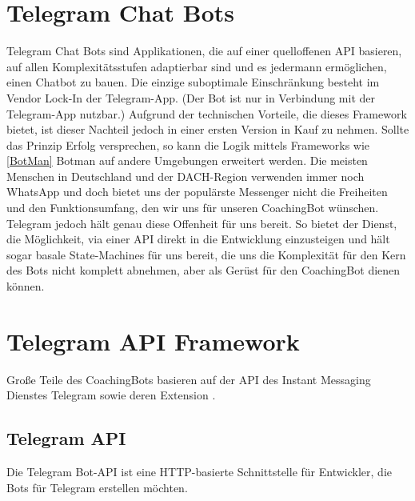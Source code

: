     \section{Telegram Chat Bots}
        Telegram Chat Bots sind Applikationen, die auf einer quelloffenen API \cite{telegramAPI} basieren, auf allen Komplexitätsstufen adaptierbar sind und es jedermann ermöglichen, einen Chatbot zu bauen. Die einzige suboptimale Einschränkung besteht im Vendor Lock-In der Telegram-App. (Der Bot ist nur in Verbindung mit der Telegram-App \cite{telegram} nutzbar.) Aufgrund der technischen Vorteile, die dieses Framework bietet, ist dieser Nachteil jedoch in einer ersten Version in Kauf zu nehmen. Sollte das Prinzip Erfolg versprechen, so kann die Logik mittels Frameworks wie \ref{BotMan} Botman auf andere Umgebungen erweitert werden.
        Die meisten Menschen in Deutschland und der DACH-Region verwenden immer noch WhatsApp \cite{Nutzerzahlen} und doch bietet uns der populärste Messenger nicht die Freiheiten und den Funktionsumfang, den wir uns für unseren CoachingBot wünschen. Telegram jedoch hält genau diese Offenheit für uns bereit. \cite{telegramVergleich} So bietet der Dienst, die Möglichkeit, via einer API direkt in die Entwicklung einzusteigen und hält sogar basale State-Machines für uns bereit, die uns die Komplexität für den Kern des Bots nicht komplett abnehmen, aber als Gerüst für den CoachingBot dienen können.

    \section{Telegram API Framework}
        Große Teile des CoachingBots basieren auf der API des Instant Messaging Dienstes Telegram\cite{telegramAPI} sowie deren Extension \cite{telegramAPIext}. 

        \subsection{Telegram API} \label{Grundlagen: Telegram API}
            \glqq Die Telegram Bot-API ist eine HTTP-basierte Schnittstelle für Entwickler, die Bots für Telegram erstellen möchten.\grqq \cite{core_telegram_api} 



